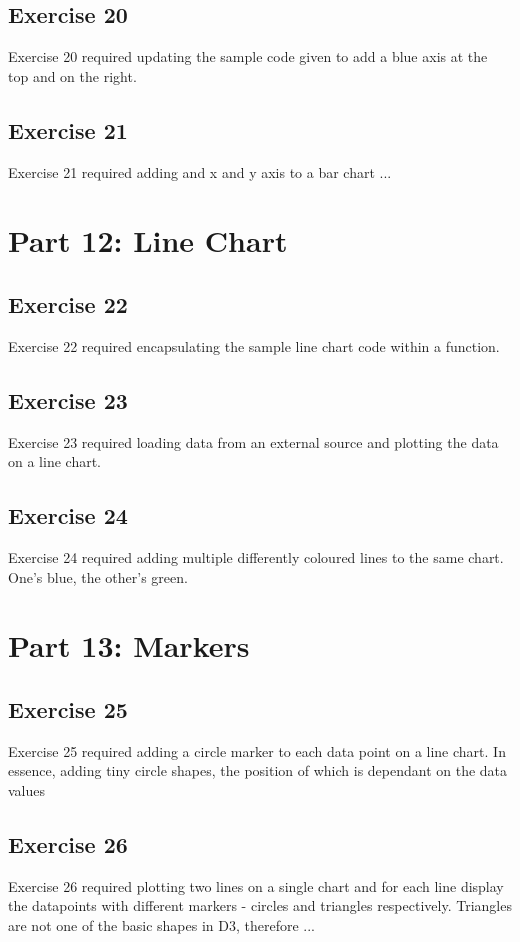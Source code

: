 \documentclass[11pt]{article}   	%
\begin{document}
\subsection{Exercise 20 }
Exercise 20 required updating the sample code given to add a blue axis at the top and on the right.

\subsection{Exercise 21 }
Exercise 21 required adding and x and y axis to a bar chart ...


\section{Part 12: Line Chart }
\subsection{ Exercise 22 }
Exercise 22 required encapsulating the sample line chart code within a function.

\subsection{Exercise 23 }
Exercise 23 required loading data from an external source and plotting the data on a line chart.

\subsection{ Exercise 24 }
Exercise 24 required adding multiple differently coloured lines to the same chart. One's blue, the other's green. 

\section{Part 13: Markers}
\subsection{Exercise 25 }
Exercise 25 required adding a circle marker to each data point on a line chart. In essence, adding tiny circle shapes, the position of which is dependant on the data values 


\subsection{ Exercise 26 }
Exercise 26 required plotting two lines on a single chart and for each line display the datapoints with different markers - circles and triangles respectively. Triangles are not one of the basic shapes in D3, therefore ...
\end{document}
